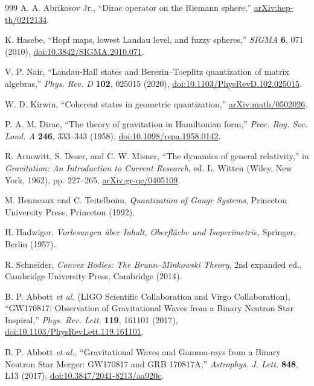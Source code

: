 \documentclass[aps,prd,reprint,nofootinbib,superscriptaddress,floatfix]{revtex4-2}
\numberwithin{equation}{section}
\theoremstyle{definition}
\theoremstyle{plain}
\begin{document}
\begin{thebibliography}{999}
A. A. Abrikosov Jr.,
``Dirac operator on the Riemann sphere,''
\href{https://arxiv.org/abs/hep-th/0212134}{arXiv:hep-th/0212134}.

K. Hasebe,
``Hopf maps, lowest Landau level, and fuzzy spheres,''
\emph{SIGMA} \textbf{6}, 071 (2010),
\href{https://doi.org/10.3842/SIGMA.2010.071}{doi:10.3842/SIGMA.2010.071}.


V. P. Nair,
``Landau-Hall states and Berezin--Toeplitz quantization of matrix algebras,''
\emph{Phys. Rev. D} \textbf{102}, 025015 (2020),
\href{https://doi.org/10.1103/PhysRevD.102.025015}{doi:10.1103/PhysRevD.102.025015}.

W. D. Kirwin,
``Coherent states in geometric quantization,''
\href{https://arxiv.org/abs/math/0502026}{arXiv:math/0502026}.

P. A. M. Dirac,
``The theory of gravitation in Hamiltonian form,''
\emph{Proc. Roy. Soc. Lond. A} \textbf{246}, 333--343 (1958),
\href{https://doi.org/10.1098/rspa.1958.0142}{doi:10.1098/rspa.1958.0142}.

R. Arnowitt, S. Deser, and C. W. Misner,
``The dynamics of general relativity,''
in \emph{Gravitation: An Introduction to Current Research},
ed. L. Witten (Wiley, New York, 1962), pp. 227--265,
\href{https://arxiv.org/abs/gr-qc/0405109}{arXiv:gr-qc/0405109}.

M. Henneaux and C. Teitelboim,
\emph{Quantization of Gauge Systems},
Princeton University Press, Princeton (1992).

H. Hadwiger,
\emph{Vorlesungen \"uber Inhalt, Oberfl\"ache und Isoperimetrie},
Springer, Berlin (1957).

R. Schneider,
\emph{Convex Bodies: The Brunn--Minkowski Theory},
2nd expanded ed., Cambridge University Press, Cambridge (2014).

B. P. Abbott \emph{et al.} (LIGO Scientific Collaboration and Virgo Collaboration),
``GW170817: Observation of Gravitational Waves from a Binary Neutron Star Inspiral,''
\emph{Phys. Rev. Lett.} \textbf{119}, 161101 (2017),
\href{https://doi.org/10.1103/PhysRevLett.119.161101}{doi:10.1103/PhysRevLett.119.161101}.

B. P. Abbott \emph{et al.},
``Gravitational Waves and Gamma-rays from a Binary Neutron Star Merger: GW170817 and GRB 170817A,''
\emph{Astrophys. J. Lett.} \textbf{848}, L13 (2017),
\href{https://doi.org/10.3847/2041-8213/aa920c}{doi:10.3847/2041-8213/aa920c}.


\end{thebibliography}
\end{document}
